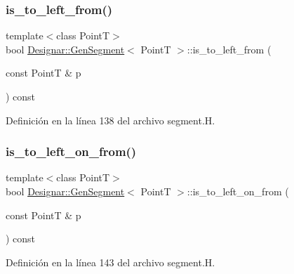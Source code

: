 \subsubsection{\texorpdfstring{is\+\_\+to\+\_\+left\+\_\+from()}{is\_to\_left\_from()}}
{\footnotesize\ttfamily template$<$class PointT$>$ \\
bool \hyperlink{class_designar_1_1_gen_segment}{Designar\+::\+Gen\+Segment}$<$ PointT $>$\+::is\+\_\+to\+\_\+left\+\_\+from (\begin{DoxyParamCaption}\item[{const PointT \&}]{p }\end{DoxyParamCaption}) const\hspace{0.3cm}{\ttfamily [inline]}}



Definición en la línea 138 del archivo segment.\+H.

\mbox{\label{class_designar_1_1_gen_segment_aae82d258fa7819459f3d6512ca349af0}} 
\subsubsection{\texorpdfstring{is\+\_\+to\+\_\+left\+\_\+on\+\_\+from()}{is\_to\_left\_on\_from()}}
{\footnotesize\ttfamily template$<$class PointT$>$ \\
bool \hyperlink{class_designar_1_1_gen_segment}{Designar\+::\+Gen\+Segment}$<$ PointT $>$\+::is\+\_\+to\+\_\+left\+\_\+on\+\_\+from (\begin{DoxyParamCaption}\item[{const PointT \&}]{p }\end{DoxyParamCaption}) const\hspace{0.3cm}{\ttfamily [inline]}}



Definición en la línea 143 del archivo segment.\+H.

\mbox{\label{class_designar_1_1_gen_segment_ad9f0ddae7b869161882185d5caeea5f8}} 

